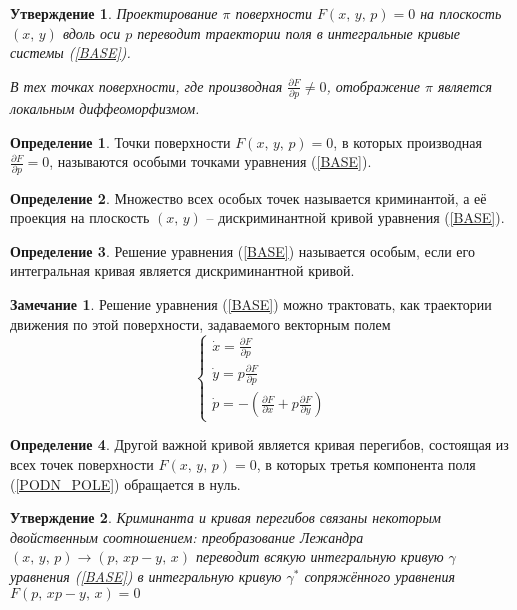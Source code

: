 \documentclass[a4paper,12pt]{article}
\theoremstyle{plain}
\newtheorem{proposition}{Утверждение}[section]
\theoremstyle{definition}
\newtheorem{definition}{Определение}[section]
\newtheorem*{note}{Замечание}
\theoremstyle{remark}
\begin{document}
\begin{proposition}
	Проектирование $\pi$ поверхности $F(x,\,y,\,p) = 0$ на плоскость $(x,\,y)$ вдоль оси $p$ переводит траектории поля в интегральные кривые системы (\ref*{BASE}).

	В тех точках поверхности, где производная $\frac{\partial F}{\partial p} \neq 0$, отображение $\pi$ является локальным диффеоморфизмом.
\end{proposition}

\begin{definition}
	Точки поверхности $F(x,\,y,\,p) = 0$, в которых производная $\frac{\partial F}{\partial p} = 0$, называются особыми точками уравнения (\ref*{BASE}).
\end{definition}

\begin{definition}
	Множество всех особых точек называется криминантой, а её проекция на плоскость $(x,\,y)$ -- дискриминантной кривой уравнения (\ref*{BASE}).
\end{definition}

\begin{definition}
	Решение уравнения (\ref*{BASE}) называется особым, если его интегральная кривая является дискриминантной кривой.
\end{definition}

\begin{note}
	Решение уравнения (\ref*{BASE}) можно трактовать, как траектории движения по этой поверхности, задаваемого векторным полем
	\begin{equation}
		\label{PODN_POLE}
		\begin{cases}
			\dot{x} = \frac{\partial F}{\partial p}  \\
			\dot{y} = p\frac{\partial F}{\partial p} \\
			\dot{p} = -\left(\frac{\partial F}{\partial x} + p\frac{\partial F}{\partial y} \right)
		\end{cases}
	\end{equation}
\end{note}

\begin{definition}
	Другой важной кривой является кривая перегибов, состоящая из всех точек поверхности $F(x,\,y,\,p) = 0$, в которых третья компонента поля (\ref*{PODN_POLE}) обращается в нуль.
\end{definition}

\begin{proposition}
	Криминанта и кривая перегибов связаны некоторым двойственным соотношением: преобразование Лежандра $(x,\,y,\,p) \to (p,\, xp - y,\, x)$ переводит всякую интегральную кривую $\gamma$ уравнения (\ref*{BASE}) в интегральную кривую $\gamma^*$ сопряжённого уравнения $F(p,\, xp - y,\, x) = 0$
\end{proposition}
\end{document}
